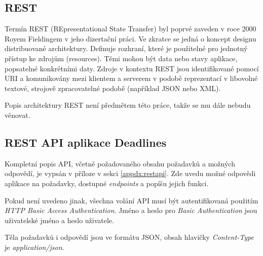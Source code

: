 \documentclass[thesis=B,czech]{FITthesis}[2012/06/26]
\begin{document}
		\subsection{REST}
			Termín REST (REpresentational State Transfer) byl poprvé zaveden v roce 2000 Royem Fieldingem v jeho dizertační práci. \cite{rest-dissertation} Ve zkratce se jedná o koncept designu distribuované architektury. Definuje rozhraní, které je použitelné pro jednotný přístup ke zdrojům (resources). Těmi mohou být data nebo stavy aplikace, popsatelné konkrétními daty.
			Zdroje v kontextu REST jsou identifikované pomocí URI a komunikovány mezi klientem a serverem v podobě reprezentací v libovolné textové, strojově zpracovatelné podobě (například JSON nebo XML). \cite{rest-youtube}
			
			Popis architektury REST není předmětem této práce, takže se mu dále nebudu věnovat.
			
		\subsection{REST API aplikace Deadlines}
			Kompletní popis API, včetně požadovaného obsahu požadavků a možných odpovědí, je vypsán v příloze v sekci \ref{appdx:restapi}. Zde uvedu možné odpovědi aplikace na požadavky, dostupné \textit{endpoints} a popíšu jejich funkci. 
			
			Pokud není uvedeno jinak, všechna volání API musí být autentifikovaná použitím \textit{HTTP Basic Access Authentication}. \cite{http-basic-auth} Jméno a heslo pro \textit{Basic Authentication} jsou uživatelské jméno a heslo uživatele.
			
			Těla požadavků i odpovědí jsou ve formátu JSON, obsah hlavičky \textit{Content-Type} je \textit{application/json}.
			
\end{document}
